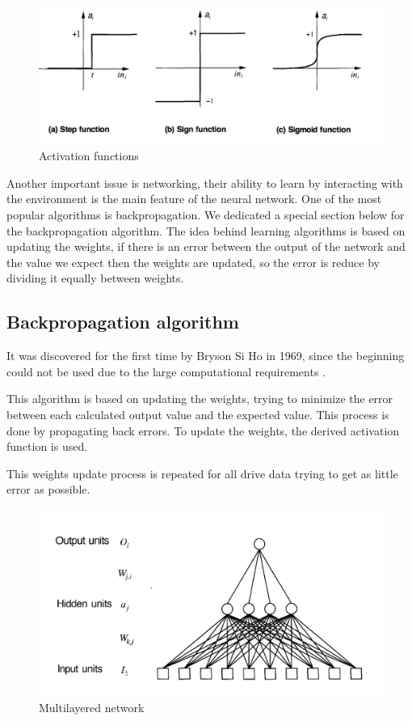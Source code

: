 \begin{figure}[htbp]
  \centerline{\includegraphics[scale=0.75]{fig/activation-fun.png}}  
  \caption{Activation functions \cite{book.neuronal.network.1995}}
  \label{fig:activation-fun}
\end{figure}
  Another important issue is networking,
   their ability to learn by interacting with the environment is the main feature of the neural network. 
   One of the most popular algorithms is backpropagation. 
   We dedicated a special section below for the backpropagation algorithm. The idea behind learning algorithms is based on updating the weights, 
   if there is an error between the output of the network and the value we expect then the weights are updated, so the error is reduce by dividing it equally between weights.
   
\subsection{Backpropagation algorithm}

It was discovered for the first time by Bryson Si Ho in 1969, 
since the beginning could not be used due to the large computational requirements \cite{book.neuronal.network.1995}.

This algorithm is based on updating the weights, trying to minimize the error between each calculated output value and the expected value. This process is done by propagating back errors.
 To update the weights, the derived activation function is used.

This weights update process is repeated for all drive data trying to get as little error as possible.


\begin{figure}[htbp]
  \centerline{\includegraphics[scale=0.45]{fig/neuronal-network-backpropagation.png}}  
  \caption{Multilayered network \cite{book.neuronal.network.1995}}
  \label{fig:neuronal-network-backpropagation}
\end{figure}

